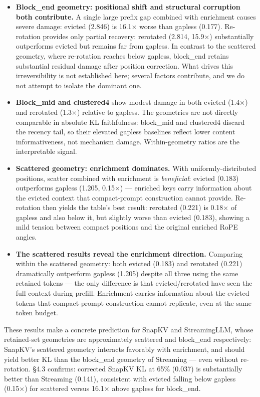 \documentclass[10pt,letterpaper]{article}
\providecommand{\tightlist}{%
  \setlength{\itemsep}{0pt}\setlength{\parskip}{0pt}}
\begin{document}
\begin{itemize}
\tightlist
\item
  \textbf{Block\_end geometry: positional shift and structural
  corruption both contribute.} A single large prefix gap combined with
  enrichment causes severe damage: evicted (2.846) is 16.1× worse than
  gapless (0.177).
  Re-rotation provides only partial recovery: rerotated (2.814, 15.9×)
  substantially outperforms evicted but remains far from gapless. In
  contrast to the scattered geometry, where re-rotation reaches below
  gapless, block\_end retains substantial residual damage after position
  correction. What drives this irreversibility is not established here;
  several factors contribute, and we do not attempt to isolate the
  dominant one.
\item
  \textbf{Block\_mid and clustered4} show modest damage in both evicted
  (1.4×) and rerotated (1.3×) relative to gapless. The geometries are
  not directly comparable in absolute KL faithfulness: block\_mid and
  clustered4 discard the recency tail, so their elevated gapless
  baselines reflect lower content informativeness, not mechanism damage.
  Within-geometry ratios are the interpretable signal.
\item
  \textbf{Scattered geometry: enrichment dominates.} With
  uniformly-distributed positions, scatter combined with enrichment is
  \emph{beneficial}: evicted (0.183) outperforms gapless (1.205, 0.15×)
  --- enriched keys carry information about the evicted context that
  compact-prompt construction cannot provide. Re-rotation then yields
  the table's best result: rerotated (0.221) is 0.18× of gapless and
  also below it, but slightly worse than evicted (0.183), showing a
  mild tension between compact positions and the original enriched
  RoPE angles.
\item
  \textbf{The scattered results reveal the enrichment direction.}
  Comparing within the scattered geometry: both evicted (0.183) and
  rerotated (0.221) dramatically outperform gapless (1.205) despite all
  three using the same retained tokens --- the only difference is that
  evicted/rerotated have seen the full context during prefill. Enrichment
  carries information about the evicted tokens that compact-prompt
  construction cannot replicate, even at the same token budget.
\end{itemize}

These results make a concrete prediction for SnapKV and StreamingLLM,
whose retained-set geometries are approximately scattered and block\_end
respectively: SnapKV's scattered geometry interacts favorably with enrichment,
and should yield better KL than the block\_end geometry of Streaming --- even
without re-rotation. §4.3 confirms: corrected SnapKV KL at 65\% (0.037) is
substantially better than Streaming (0.141), consistent with evicted falling
below gapless (0.15×) for scattered versus 16.1× above gapless for block\_end.
\end{document}
